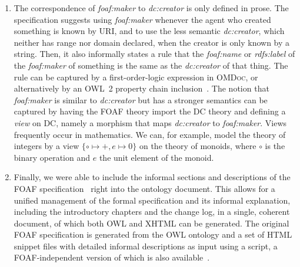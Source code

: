 \documentclass{llncs}
\renewcommand{\omdoc}{\textsc{OMDoc}\xspace}
\begin{document}
\begin{small}
\begin{enumerate}
\item The correspondence of \textit{foaf:maker} to \textit{dc:creator} is only defined in
  prose.  The specification suggests using \textit{foaf:maker} whenever the agent who
  created something is known by URI, and to use the less semantic \textit{dc:creator},
  which neither has range nor domain declared, when the creator is only known by a string.
  Then, it also informally states a rule that the \textit{foaf:name} or
  \textit{rdfs:label} of the \textit{foaf:maker} of something is the same as the
  \textit{dc:creator} of that thing.  The rule can be captured by a first-order-logic
  expression in \omdoc, or alternatively by an OWL~2 property chain
  inclusion~\cite{GrauEtAl:OWL2}.  The notion that \textit{foaf:maker} is similar to
  \textit{dc:creator} but has a stronger semantics can be captured by having the FOAF
  theory import the DC theory and defining a \emph{view} on DC, namely a morphism that
  maps \textit{dc:creator} to \textit{foaf:maker}. Views frequently occur in mathematics.
  We can, for example, model the theory of integers by a view $\{\circ\mapsto +,e\mapsto
  0\}$ on the theory of monoids, where $\circ$ is the binary operation and $e$ the unit
  element of the monoid.
\item Finally, we were able to include the informal sections and descriptions of the FOAF
  specification~\cite{FOAF:spec} right into the ontology document.  This allows for a
  unified management of the formal specification and its informal explanation, including
  the introductory chapters and the change log, in a single, coherent document, of which
  both OWL and XHTML can be generated. The original FOAF specification is generated from
  the OWL ontology and a set of HTML snippet files with detailed informal descriptions as
  input using a script, a FOAF-independent version of which is also
  available~\cite{specgen}.
 \end{enumerate}
\end{small}
\end{document}
